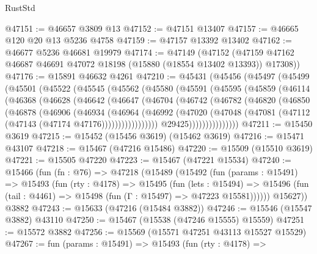 \begin{lexlean}{RustStd}
\begin{coremodule}
@47151 := @46657 @3809 @13
@47152 := @47151 @13407
@47157 := @46665 @120 @20 @13 @5236 @4758
@47159 := @47157 @13392 @13402
@47162 := @46677 @5236 @46681 @19979
@47174 := @47149
    (@47152 (@47159 @47162 @46687 @46691 @47072 @18198 (@15880 (@18554 @13402 @13393)) @17308))
@47176 := @15891 @46632 @4261
@47210 := @45431
    (@45456
      (@45497
        (@45499
          (@45501
            (@45522
              (@45545
                (@45562
                  (@45580
                    (@45591
                      (@45595
                        (@45859
                          (@46114
                            (@46368
                              (@46628
                                (@46642
                                  (@46647
                                    (@46704
                                      (@46742
                                        (@46782
                                          (@46820
                                            (@46850
                                              (@46878
                                                (@46906
                                                  (@46934
                                                    (@46964
                                                      (@46992
                                                        (@47020
                                                          (@47048
                                                            (@47081
                                                              (@47112
                                                                (@47143
                                                                  (@47174 @47176)))))))))))))))))
                                  @29425)))))))))))))))
@47211 := @15450 @3619
@47215 := @15452 (@15456 @3619) (@15462 @3619)
@47216 := @15471 @43107
@47218 := @15467 (@47216 @15486)
@47220 := @15509 (@15510 @3619)
@47221 := @15505 @47220
@47223 := @15467 (@47221 @15534)
@47240 := @15466
    (fun (fn : @76) =>
    @47218
      (@15489
        (@15492
          (fun (params : @15491) =>
          @15493
            (fun (rty : @4178) =>
            @15495
              (fun (lets : @15494) =>
              @15496 (fun (tail : @4461) => @15498 (fun (Γ : @15497) => @47223 @15581))))))
        @15627))
    @3882
@47243 := @15633 (@47216 (@15484 @3882))
@47246 := @15546 (@15547 @3882) @43110
@47250 := @15467 (@15538 (@47246 @15555) @15559)
@47251 := @15572 @3882
@47256 := @15569 (@15571 @47251 @43113 @15527 @15529)
@47267 := fun (params : @15491) =>
  @15493
    (fun (rty : @4178) =>

\end{coremodule}
\end{lexlean}
